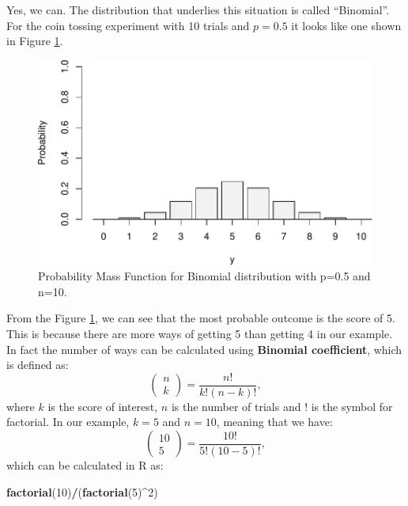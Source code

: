 \documentclass[
]{book}
\newenvironment{Shaded}{\begin{snugshade}}{\end{snugshade}}
\newcommand{\DecValTok}[1]{\textcolor[rgb]{0.00,0.00,0.81}{#1}}
\newcommand{\KeywordTok}[1]{\textcolor[rgb]{0.13,0.29,0.53}{\textbf{#1}}}
\newcommand{\NormalTok}[1]{#1}
\newcommand{\OperatorTok}[1]{\textcolor[rgb]{0.81,0.36,0.00}{\textbf{#1}}}
\theoremstyle{definition}
\theoremstyle{definition}
\theoremstyle{definition}
\theoremstyle{definition}
\theoremstyle{remark}
\begin{document}
Yes, we can. The distribution that underlies this situation is called ``Binomial''. For the coin tossing experiment with 10 trials and \(p=0.5\) it looks like one shown in Figure \ref{fig:binomialPMF05}.

\begin{figure}
\centering
\includegraphics{Svetunkov---Statistics-for-Business-Analytics_files/figure-latex/binomialPMF05-1.pdf}
\caption{\label{fig:binomialPMF05}Probability Mass Function for Binomial distribution with p=0.5 and n=10.}
\end{figure}

From the Figure \ref{fig:binomialPMF05}, we can see that the most probable outcome is the score of 5. This is because there are more ways of getting 5 than getting 4 in our example. In fact the number of ways can be calculated using \textbf{Binomial coefficient}, which is defined as:
\begin{equation}
    \begin{pmatrix} n \\ k \end{pmatrix} = \frac{n!}{k!(n-k)!},
    \label{eq:BinomialCoefficient}
\end{equation}
where \(k\) is the score of interest, \(n\) is the number of trials and \(!\) is the symbol for factorial. In our example, \(k=5\) and \(n=10\), meaning that we have:
\begin{equation*}
    \begin{pmatrix} 10 \\ 5 \end{pmatrix} = \frac{10!}{5!(10-5)!} ,
\end{equation*}
which can be calculated in R as:

\begin{Shaded}
\begin{Highlighting}[]
\KeywordTok{factorial}\NormalTok{(}\DecValTok{10}\NormalTok{)}\OperatorTok{/}\NormalTok{(}\KeywordTok{factorial}\NormalTok{(}\DecValTok{5}\NormalTok{)}\OperatorTok{\^{}}\DecValTok{2}\NormalTok{)}
\end{Highlighting}
\end{Shaded}
\end{document}
